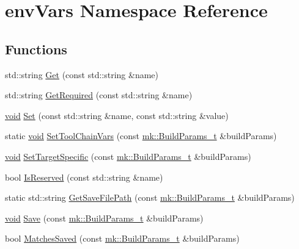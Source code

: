 \hypertarget{namespaceenv_vars}{}\section{env\+Vars Namespace Reference}
\label{namespaceenv_vars}
\subsection*{Functions}
\begin{DoxyCompactItemize}
\item 
std\+::string \hyperlink{namespaceenv_vars_a3feb0f78e163a75575561f8a6691b8bc}{Get} (const std\+::string \&name)
\item 
std\+::string \hyperlink{namespaceenv_vars_a1f06ff0299bdede74bc2deb00f9992d7}{Get\+Required} (const std\+::string \&name)
\item 
\hyperlink{_t_e_m_p_l_a_t_e__cdef_8h_ac9c84fa68bbad002983e35ce3663c686}{void} \hyperlink{namespaceenv_vars_a7dbe4a86c94ef0618212da7e1fdd6521}{Set} (const std\+::string \&name, const std\+::string \&value)
\item 
static \hyperlink{_t_e_m_p_l_a_t_e__cdef_8h_ac9c84fa68bbad002983e35ce3663c686}{void} \hyperlink{namespaceenv_vars_aa682ecf900be094453bae92dd03d0a95}{Set\+Tool\+Chain\+Vars} (const \hyperlink{structmk_1_1_build_params__t}{mk\+::\+Build\+Params\+\_\+t} \&build\+Params)
\item 
\hyperlink{_t_e_m_p_l_a_t_e__cdef_8h_ac9c84fa68bbad002983e35ce3663c686}{void} \hyperlink{namespaceenv_vars_a458e74839c483afb144f17057673a0d0}{Set\+Target\+Specific} (const \hyperlink{structmk_1_1_build_params__t}{mk\+::\+Build\+Params\+\_\+t} \&build\+Params)
\item 
bool \hyperlink{namespaceenv_vars_a5d4a5c58b8e029f75e53d01f6c0eb8d4}{Is\+Reserved} (const std\+::string \&name)
\item 
static std\+::string \hyperlink{namespaceenv_vars_a99234135d783ee780967ae55d5edbba1}{Get\+Save\+File\+Path} (const \hyperlink{structmk_1_1_build_params__t}{mk\+::\+Build\+Params\+\_\+t} \&build\+Params)
\item 
\hyperlink{_t_e_m_p_l_a_t_e__cdef_8h_ac9c84fa68bbad002983e35ce3663c686}{void} \hyperlink{namespaceenv_vars_a9f41398658aa6c0b496a6f5d3f3d8912}{Save} (const \hyperlink{structmk_1_1_build_params__t}{mk\+::\+Build\+Params\+\_\+t} \&build\+Params)
\item 
bool \hyperlink{namespaceenv_vars_afd1a4e2230ec9030fb5d8d876f50c6ca}{Matches\+Saved} (const \hyperlink{structmk_1_1_build_params__t}{mk\+::\+Build\+Params\+\_\+t} \&build\+Params)
\end{DoxyCompactItemize}


